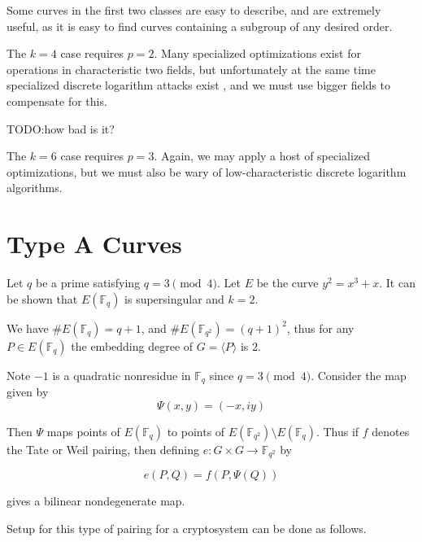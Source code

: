 Some curves in the first two classes are easy to describe, and are
extremely useful, as it is easy to find curves containing a
subgroup of any desired order.

The $k=4$ case requires $p=2$.
Many specialized optimizations exist for
operations in characteristic two fields,
but unfortunately at the same time specialized discrete logarithm attacks
exist \cite{coppersmith}, and we must use bigger fields to compensate for
this. 

TODO:how bad is it?

The $k=6$ case requires $p=3$. Again, we may apply
a host of specialized optimizations, but we must also be wary of
low-characteristic discrete logarithm algorithms.

\section { Type A Curves }

Let $q$ be a prime satisfying $q = 3 \pmod{4}$.
Let $E$ be the curve $y^2 = x^3 + x$. It can be shown \cite{silverman86}
that $E(\mathbb{F}_q)$ is supersingular and $k = 2$.

We have $\#E(\mathbb{F}_q) = q+1$, and $\#E(\mathbb{F}_{q^2}) = (q+1)^2$,
thus for any $P\in E(\mathbb{F}_q)$
the embedding degree of $G = \langle P \rangle$ is 2.

Note $-1$ is a quadratic nonresidue in $\mathbb{F}_q$ since $q = 3\pmod{4}$.
Consider the map given by
\[ \Psi(x, y) = (-x, i y) \]

Then $\Psi$ maps points of $E(\mathbb{F}_q)$ to points of
$E(\mathbb{F}_{q^2}) \setminus E(\mathbb{F}_q)$. Thus if $f$ denotes the
Tate or Weil pairing, then defining $e:G \times G \rightarrow \mathbb{F}_{q^2}$
by

\[ e(P,Q) = f(P, \Psi(Q)) \]

gives a bilinear nondegenerate map.

Setup for this type of pairing for a cryptosystem can be done as follows.

